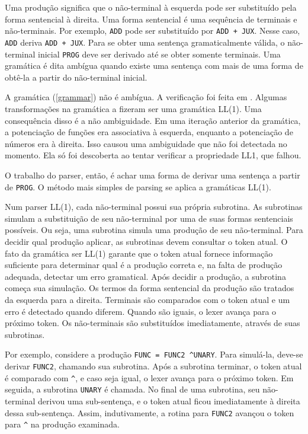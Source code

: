 Uma produção significa que o não-terminal à esquerda pode ser substituído
pela forma sentencial à direita.
Uma forma sentencial é uma sequência de terminais e não-terminais.
Por exemplo, \texttt{ADD} pode ser substituído por \texttt{ADD + JUX}.
Nesse caso, \texttt{ADD} deriva \texttt{ADD + JUX}.
Para se obter uma sentença gramaticalmente válida,
o não-terminal inicial \texttt{PROG} deve ser derivado até se obter somente terminais.
Uma gramática é dita ambígua quando existe uma sentença com mais de uma forma de
obtê-la a partir do não-terminal inicial.

A gramática (\ref{grammar}) não é ambígua.
A verificação foi feita em \cite{GramCheck}.
Algumas transformações na gramática a fizeram ser uma gramática LL(1).
Uma consequência disso é a não ambiguidade.
Em uma iteração anterior da gramática, a potenciação de funções era associativa à esquerda,
enquanto a potenciação de números era à direita.
Isso causou uma ambiguidade que não foi detectada no momento.
Ela só foi descoberta ao tentar verificar a propriedade LL1, que falhou.

O trabalho do parser, então, é achar uma forma de derivar uma sentença a partir de \texttt{PROG}.
O método mais simples de parsing se aplica a gramáticas LL(1).

Num parser LL(1), cada não-terminal possui sua própria subrotina.
As subrotinas simulam a substituição de seu não-terminal
por uma de suas formas sentenciais possíveis.
Ou seja, uma subrotina simula uma produção de seu não-terminal.
Para decidir qual produção aplicar, as subrotinas devem consultar o token atual.
O fato da gramática ser LL(1) garante que o token atual fornece
informação suficiente para determinar qual é a produção correta e, na falta de produção adequada,
detectar um erro gramatical. Após decidir a produção, a subrotina começa sua simulação.
Os termos da forma sentencial da produção são tratados da esquerda para a direita.
Terminais são comparados com o token atual e um erro é detectado quando diferem.
Quando são iguais, o lexer avança para o próximo token.
Os não-terminais são substituídos imediatamente, através de suas subrotinas.

Por exemplo, considere a produção \texttt{FUNC = FUNC2 \textasciicircum UNARY}.
Para simulá-la, deve-se derivar \texttt{FUNC2}, chamando sua subrotina.
Após a subrotina terminar, o token atual é comparado com \texttt{\textasciicircum},
e caso seja igual, o lexer avança para o próximo token.
Em seguida, a subrotina \texttt{UNARY} é chamada.
No final de uma subrotina, seu não-terminal derivou uma sub-sentença,
e o token atual ficou imediatamente à direita dessa sub-sentença.
Assim, indutivamente, a rotina para \texttt{FUNC2} avançou
o token para \texttt{\textasciicircum} na produção examinada.

